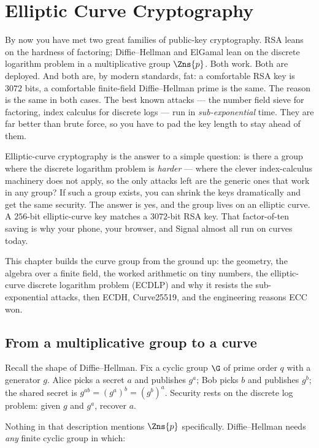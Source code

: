 \chapter{Elliptic Curve Cryptography}

By now you have met two great families of public-key cryptography. RSA leans on the
hardness of factoring; Diffie--Hellman and ElGamal lean on the discrete logarithm
problem in a multiplicative group $\Zns{p}$. Both work. Both are deployed. And both
are, by modern standards, fat: a comfortable RSA key is $3072$ bits, a comfortable
finite-field Diffie--Hellman prime is the same. The reason is the same in both cases.
The best known attacks --- the number field sieve for factoring, index calculus for
discrete logs --- run in \emph{sub-exponential} time. They are far better than brute
force, so you have to pad the key length to stay ahead of them.

Elliptic-curve cryptography is the answer to a simple question: is there a group where
the discrete logarithm problem is \emph{harder} --- where the clever index-calculus
machinery does not apply, so the only attacks left are the generic ones that work in
any group? If such a group exists, you can shrink the keys dramatically and get the
same security. The answer is yes, and the group lives on an elliptic curve. A $256$-bit
elliptic-curve key matches a $3072$-bit RSA key. That factor-of-ten saving is why your
phone, your browser, and Signal almost all run on curves today.

This chapter builds the curve group from the ground up: the geometry, the algebra over
a finite field, the worked arithmetic on tiny numbers, the elliptic-curve discrete
logarithm problem (ECDLP) and why it resists the sub-exponential attacks, then ECDH,
Curve25519, and the engineering reasons ECC won.

\chapterline

\section{From a multiplicative group to a curve}
\label{ch21:motivation}

Recall the shape of Diffie--Hellman. Fix a cyclic group $\G$ of prime order $q$ with a
generator $g$. Alice picks a secret $a$ and publishes $g^a$; Bob picks $b$ and publishes
$g^b$; the shared secret is $g^{ab} = (g^a)^b = (g^b)^a$. Security rests on the discrete
log problem: given $g$ and $g^a$, recover $a$.

Nothing in that description mentions $\Zns{p}$ specifically. Diffie--Hellman needs
\emph{any} finite cyclic group in which:

